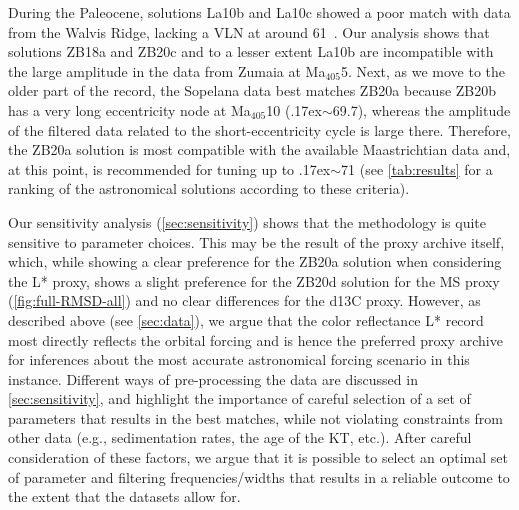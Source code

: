 \documentclass[draft]{agujournal2019}
\newcommand{\appr}{\raise.17ex\hbox{\(\scriptstyle\sim\)}} %
\newcommand{\ma}[1]{Ma\(_{405}\)#1} %
\newcommand{\ijk}{\textcolor{blue}}
\begin{document}
During the Paleocene, solutions La10b and La10c showed a poor match with data from the Walvis Ridge, lacking a \gls{VLN} at around \qty{61}{\millionyearago}~\cite{ZeebeLourens2022EPSL}.
Our analysis shows that solutions ZB18a and ZB20c and to a lesser extent La10b are incompatible with the large amplitude in the data from Zumaia at \ma{5}.
Next, as we move to the older part of the record, the Sopelana data best matches ZB20a because ZB20b has a very long eccentricity node at \ma{10} (\appr\qty{69.7}{\millionyearago}), whereas the amplitude of the filtered data related to the short-eccentricity cycle is large there.
Therefore, the ZB20a solution is most compatible with the available Maastrichtian data and, at this point, is recommended for tuning up to \appr\qty{71}{\millionyearago}
(see \cref{tab:results} for a ranking of the astronomical solutions according to these criteria).

Our sensitivity analysis (\ref{sec:sensitivity}) shows that the methodology is quite sensitive to parameter choices.
This may be the result of the proxy archive itself, which, while showing a clear preference for the ZB20a solution when considering the \gls{L*} proxy, shows a slight preference for the ZB20d solution for the \gls{MS} proxy (\cref{fig:full-RMSD-all}) and no clear differences for the \gls{d13C} proxy.
However, as described above (see \cref{sec:data}), we argue that the color reflectance \gls{L*} record most directly reflects the orbital forcing and is hence the preferred proxy archive for inferences about the most accurate astronomical forcing scenario in this instance.
Different ways of pre-processing the data are discussed in \ref{sec:sensitivity}, and highlight the importance of careful selection of a set of parameters that results in the best matches, while not violating constraints from other data (e.g., sedimentation rates, the age of the \gls{KT}, etc.).
After careful consideration of these factors, we argue that it is possible to select an optimal set of parameter and filtering frequencies/widths that results in a reliable outcome to the extent that the datasets allow for.
\end{document}
